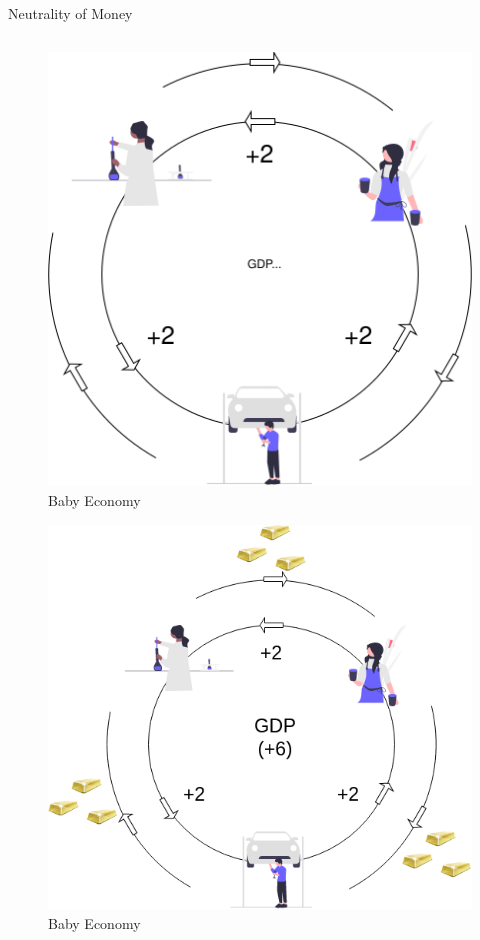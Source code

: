 \begin{frame}{Neutrality of Money}
\protect\hypertarget{neutrality-of-money}{}
\begin{columns}[T]
\begin{column}{0.48\textwidth}
\begin{overprint}


\begin{figure}
\centering
\includegraphics[width=1\textwidth,height=\textheight]{assets/circular.png}
\caption{Baby Economy}
\end{figure}


\begin{figure}
\centering
\includegraphics[width=1\textwidth,height=\textheight]{assets/circular_numeraire.png}
\caption{Baby Economy}
\end{figure}


\end{overprint}
\end{column}
\end{columns}
\end{frame}
